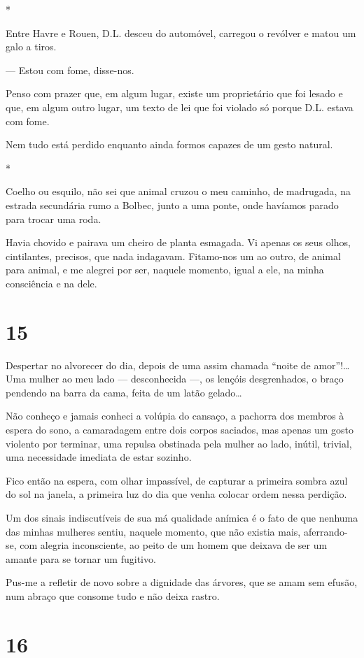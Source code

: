 *

Entre Havre e Rouen, D.L. desceu do automóvel, carregou o revólver e
matou um galo a tiros.

--- Estou com fome, disse-nos.

Penso com prazer que, em algum lugar, existe um proprietário que foi
lesado e que, em algum outro lugar, um texto de lei que foi violado só
porque D.L. estava com fome.

Nem tudo está perdido enquanto ainda formos capazes de um gesto natural.

*

Coelho ou esquilo, não sei que animal cruzou o meu caminho, de
madrugada, na estrada secundária rumo a Bolbec, junto a uma ponte, onde
havíamos parado para trocar uma roda.

Havia chovido e pairava um cheiro de planta esmagada. Vi apenas os seus
olhos, cintilantes, precisos, que nada indagavam. Fitamo-nos um ao
outro, de animal para animal, e me alegrei por ser, naquele momento,
igual a ele, na minha consciência e na dele.

\section{15}

Despertar no alvorecer do dia, depois de uma assim chamada ``noite de
amor''!\ldots{} Uma mulher ao meu lado --- desconhecida ---, os lençóis
desgrenhados, o braço pendendo na barra da cama, feita de um latão
gelado\ldots{}

Não conheço e jamais conheci a volúpia do cansaço, a pachorra dos
membros à espera do sono, a camaradagem entre dois corpos saciados, mas
apenas um gosto violento por terminar, uma repulsa obstinada pela mulher
ao lado, inútil, trivial, uma necessidade imediata de estar sozinho.

Fico então na espera, com olhar impassível, de capturar a primeira
sombra azul do sol na janela, a primeira luz do dia que venha colocar
ordem nessa perdição.

Um dos sinais indiscutíveis de sua má qualidade anímica é o fato de que
nenhuma das minhas mulheres sentiu, naquele momento, que não existia
mais, aferrando-se, com alegria inconsciente, ao peito de um homem que
deixava de ser um amante para se tornar um fugitivo.

Pus-me a refletir de novo sobre a dignidade das árvores, que se amam sem
efusão, num abraço que consome tudo e não deixa rastro.

\section{16}

